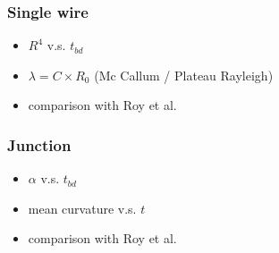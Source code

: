         \subsubsection{Single wire}
        \begin{itemize}
            \item $R^4$ v.s. $t_{bd}$
            \item $\lambda = C \times R_0$ (Mc Callum / Plateau Rayleigh)
            \item comparison with Roy et al.
        \end{itemize}
        \subsubsection{Junction}
        \begin{itemize}
            \item $\alpha$ v.s. $t_{bd}$
            \item mean curvature v.s. $t$
            \item comparison with Roy et al.
        \end{itemize}
    